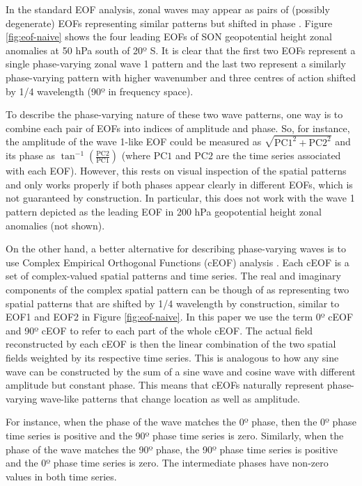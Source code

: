 \documentclass[pdflatex,lineno,sn-basic]{sn-jnl}
\theoremstyle{thmstyleone}%
\theoremstyle{thmstyletwo}%
\theoremstyle{thmstylethree}%
\begin{document}
In the standard EOF analysis, zonal waves may appear as pairs of (possibly degenerate) EOFs representing similar patterns but shifted in phase \citep{horel1984}.
Figure \ref{fig:eof-naive} shows the four leading EOFs of SON geopotential height zonal anomalies at 50 hPa south of 20º S.
It is clear that the first two EOFs represent a single phase-varying zonal wave 1 pattern and the last two represent a similarly phase-varying pattern with higher wavenumber and three centres of action shifted by 1/4 wavelength (90º in frequency space).

To describe the phase-varying nature of these two wave patterns, one way is to combine each pair of EOFs into indices of amplitude and phase.
So, for instance, the amplitude of the wave 1-like EOF could be measured as \(\sqrt{\mathrm{PC1}^2 + \mathrm{PC2}^2}\) and its phase as \(\tan^{-1} \left ( \frac{\mathrm{PC2}}{\mathrm{PC1}} \right )\) (where \(\mathrm{PC1}\) and \(\mathrm{PC2}\) are the time series associated with each EOF).
However, this rests on visual inspection of the spatial patterns and only works properly if both phases appear clearly in different EOFs, which is not guaranteed by construction.
In particular, this does not work with the wave 1 pattern depicted as the leading EOF in 200 hPa geopotential height zonal anomalies (not shown).

On the other hand, a better alternative for describing phase-varying waves is to use Complex Empirical Orthogonal Functions (cEOF) analysis \citep{horel1984}.
Each cEOF is a set of complex-valued spatial patterns and time series.
The real and imaginary components of the complex spatial pattern can be though of as representing two spatial patterns that are shifted by 1/4 wavelength by construction, similar to EOF1 and EOF2 in Figure \ref{fig:eof-naive}.
In this paper we use the term 0º cEOF and 90º cEOF to refer to each part of the whole cEOF.
The actual field reconstructed by each cEOF is then the linear combination of the two spatial fields weighted by its respective time series.
This is analogous to how any sine wave can be constructed by the sum of a sine wave and cosine wave with different amplitude but constant phase.
This means that cEOFs naturally represent phase-varying wave-like patterns that change location as well as amplitude.

For instance, when the phase of the wave matches the 0º phase, then the 0º phase time series is positive and the 90º phase time series is zero.
Similarly, when the phase of the wave matches the 90º phase, the 90º phase time series is positive and the 0º phase time series is zero.
The intermediate phases have non-zero values in both time series.
\end{document}
